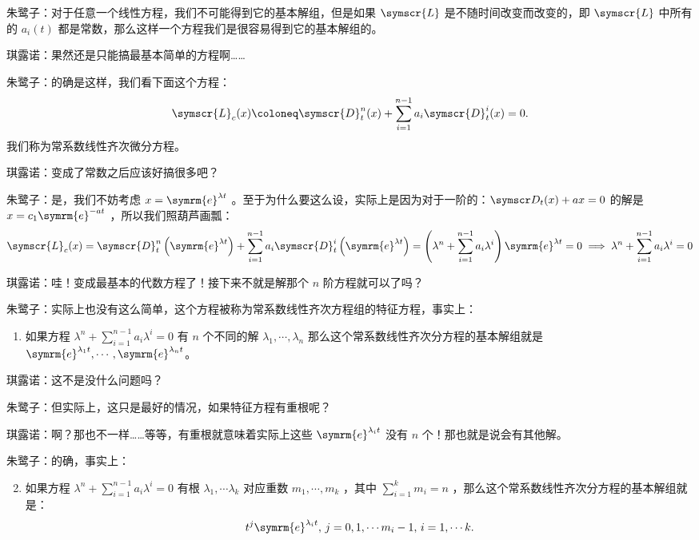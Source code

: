 朱鹭子：对于任意一个线性方程，我们不可能得到它的基本解组，但是如果 \(\symscr{L} \) 是不随时间改变而改变的，即 \(\symscr{L} \) 中所有的 \(a_i(t)\) 都是常数，那么这样一个方程我们是很容易得到它的基本解组的。

琪露诺：果然还是只能搞最基本简单的方程啊……

朱鹭子：的确是这样，我们看下面这个方程：
\[
	\symscr{L}_c (x)\coloneq\symscr{D} _t^n(x)+ \sum_{i=1}^{n-1} a_i\symscr{D} ^i_t(x)=0
	.\]
我们称为常系数线性齐次微分方程。

琪露诺：变成了常数之后应该好搞很多吧？

朱鹭子：是，我们不妨考虑 \( x =\symrm{e} ^{\lambda t}\) 。至于为什么要这么设，实际上是因为对于一阶的：\( \dx+ax=0\) 的解是 \(x= c_1\symrm{e} ^{-at}\) ，所以我们照葫芦画瓢：
\[
	\symscr{L}_c (x) = \symscr{D} _t^n\left( \symrm{e} ^{\lambda t} \right) + \sum_{i=1}^{n-1} a_i\symscr{D} ^i_t\left( \symrm{e} ^{\lambda t} \right)
	=\left( \lambda ^n+ \sum_{i=1}^{n-1} a_i \lambda ^i \right)\symrm{e} ^{\lambda t}=0\implies \lambda ^n+ \sum_{i=1}^{n-1} a_i \lambda ^i =0
\]

琪露诺：哇！变成最基本的代数方程了！接下来不就是解那个 \(n\) 阶方程就可以了吗？

朱鹭子：实际上也没有这么简单，这个方程被称为常系数线性齐次方程组的特征方程，事实上：
\begin{enumerate}
	\setcounter{enumi}{0}
	\item 如果方程 \(\lambda ^n+ \sum_{i=1}^{n-1} a_i \lambda ^i =0\) 有 \(n\) 个不同的解 \(\lambda_1,\cdots ,\lambda _n \) 那么这个常系数线性齐次分方程的基本解组就是 \( \symrm{e} ^{\lambda_1t},\cdots ,\symrm{e} ^{\lambda_nt}\)。
\end{enumerate}

琪露诺：这不是没什么问题吗？

朱鹭子：但实际上，这只是最好的情况，如果特征方程有重根呢？

琪露诺：啊？那也不一样……等等，有重根就意味着实际上这些 \(\symrm{e} ^{\lambda _it}\) 没有 \(n\) 个！那也就是说会有其他解。

朱鹭子：的确，事实上：
\begin{enumerate}
	\setcounter{enumi}{1}
	\item 如果方程 \(\lambda ^n+ \sum_{i=1}^{n-1} a_i \lambda ^i =0\) 有根 \(\lambda_1,\cdots \lambda_k\) 对应重数 \(m_1,\cdots ,m_k\) ，其中 \(\sum_{i=1}^{k} m_i=n\) ，那么这个常系数线性齐次分方程的基本解组就是：
	      \[
		      t^j\symrm{e} ^{\lambda_i t},\,j=0,1,\cdots m_i-1,\,i=1,\cdots k
		      .\]
\end{enumerate}

